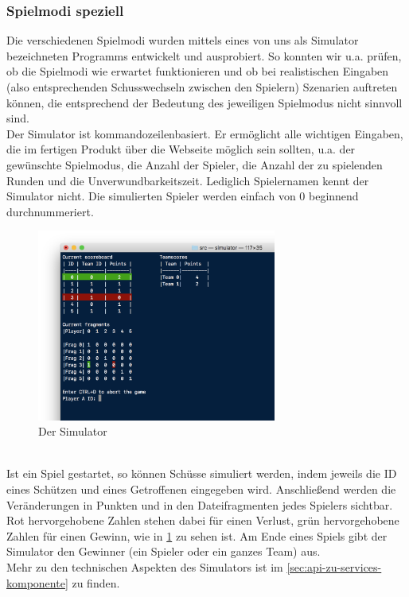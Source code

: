 \subsubsection{Spielmodi speziell}
\label{sec:spielmodi-speziell}

Die verschiedenen Spielmodi wurden mittels eines von uns als Simulator bezeichneten Programms entwickelt und ausprobiert. So konnten wir u.a. prüfen, ob die Spielmodi wie erwartet funktionieren und ob bei realistischen Eingaben (also entsprechenden Schusswechseln zwischen den Spielern) Szenarien auftreten können, die entsprechend der Bedeutung des jeweiligen Spielmodus nicht sinnvoll sind. \\
Der Simulator ist kommandozeilenbasiert. Er ermöglicht alle wichtigen Eingaben, die im fertigen Produkt über die Webseite möglich sein sollten, u.a. der gewünschte Spielmodus, die Anzahl der Spieler, die Anzahl der zu spielenden Runden und die Unverwundbarkeitszeit. Lediglich Spielernamen kennt der Simulator nicht. Die simulierten Spieler werden einfach von 0 beginnend durchnummeriert.
\begin{figure}[h]
  \centering
  \includegraphics[width=0.7\textwidth,keepaspectratio]{./040-komponenten/030-spielelogik/Simulator.png}
  \caption{Der Simulator}
  \label{fig:simulator}
\end{figure} \\
Ist ein Spiel gestartet, so können Schüsse simuliert werden, indem jeweils die ID eines Schützen und eines Getroffenen eingegeben wird. Anschließend werden die Veränderungen in Punkten und in den Dateifragmenten jedes Spielers sichtbar. Rot hervorgehobene Zahlen stehen dabei für einen Verlust, grün hervorgehobene Zahlen für einen Gewinn, wie in \cref{fig:simulator} zu sehen ist.
Am Ende eines Spiels gibt der Simulator den Gewinner (ein Spieler oder ein ganzes Team) aus. \\
Mehr zu den technischen Aspekten des Simulators ist im \cref{sec:api-zu-services-komponente} zu finden.

